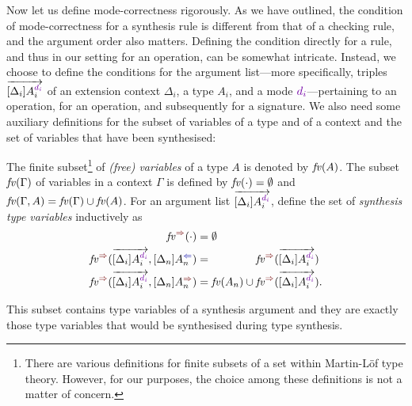 Now let us define mode-correctness rigorously.
As we have outlined, the condition of mode-correctness for a synthesis rule is different from that of a checking rule, and the argument order also matters.
Defining the condition directly for a rule, and thus in our setting for an operation, can be somewhat intricate.
Instead, we choose to define the conditions for the argument list---more specifically, triples $\biargvec$ of an extension context $\Delta_i$, a type $A_i$, and a mode $\dir{d_i}$---pertaining to an operation, for an operation, and subsequently for a signature.
We also need some auxiliary definitions for the subset of variables of a type and of a context and the set of variables that have been synthesised:
\begin{definition}
  The finite subset\footnote{%
  There are various definitions for finite subsets of a set within Martin-L\"{o}f type theory.
  However, for our purposes, the choice among these definitions is not a matter of concern.}
  of \emph{(free) variables} of a type $A$ is denoted by $\mathit{fv}(A)$.
  The subset $\mathit{fv}(\Gamma)$ of variables in a context $\Gamma$ is defined by\/ $\mathit{fv}(\cdot) = \emptyset$ and\/ $\mathit{fv}(\Gamma, A) = \mathit{fv}(\Gamma) \cup \mathit{fv}(A)$.
  For an argument list $\biargvec$, define the set of \emph{synthesis type variables} inductively as 
  \begin{align}
    \label{eq:synvar1}\synvar(\cdot)                   & = \emptyset  \\
    \label{eq:synvar2}\synvar(\biargvec, \chkbiarg[n]) & = \phantom{\fv(A_{n}) \cup {}} \synvar(\biargvec) \\
    \label{eq:synvar3}\synvar(\biargvec, \synbiarg[n]) & = \fv(A_{n}) \cup           \synvar(\biargvec).
  \end{align}
\end{definition}
This subset contains type variables of a synthesis argument and they are exactly those type variables that would be synthesised during type synthesis.

